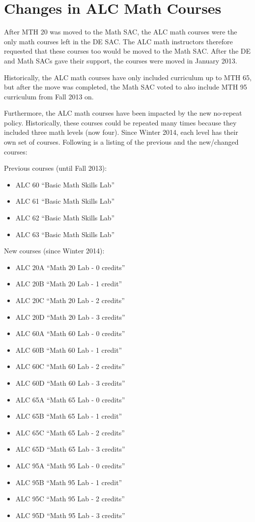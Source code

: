 \chapter{Changes in ALC Math Courses}\label{app:sec:alc}
After MTH 20 was moved to the Math SAC, the ALC math courses were the only math courses left in the DE SAC. The ALC math instructors therefore requested that these courses too would be moved to the Math SAC. After the DE and Math SACs gave their support, the courses were moved in January 2013.

Historically, the ALC math courses have only included curriculum up to MTH 65, but after the move was completed, the Math SAC voted to also include MTH 95 curriculum from Fall 2013 on.

Furthermore, the ALC math courses have been impacted by the new no-repeat policy. Historically, these courses could be repeated many times because they included three math levels (now four). Since Winter 2014, each level has their own set of courses. Following is a listing  of the previous and the new/changed courses:

Previous courses (until Fall 2013):
\begin{itemize}[label={}]
  \item ALC 60 ``Basic Math Skills Lab''
  \item ALC 61 ``Basic Math Skills Lab''
  \item ALC 62 ``Basic Math Skills Lab''
  \item ALC 63 ``Basic Math Skills Lab''
\end{itemize}
New courses (since Winter 2014):
\begin{itemize}[label={}]
  \item ALC 20A ``Math 20 Lab - 0 credits'' 
  \item ALC 20B ``Math 20 Lab - 1 credit'' 
  \item ALC 20C ``Math 20 Lab - 2 credits'' 
  \item ALC 20D ``Math 20 Lab - 3 credits'' 

  \item ALC 60A ``Math 60 Lab - 0 credits'' 
  \item ALC 60B ``Math 60 Lab - 1 credit'' 
  \item ALC 60C ``Math 60 Lab - 2 credits'' 
  \item ALC 60D ``Math 60 Lab - 3 credits'' 

  \item ALC 65A ``Math 65 Lab - 0 credits'' 
  \item ALC 65B ``Math 65 Lab - 1 credit'' 
  \item ALC 65C ``Math 65 Lab - 2 credits'' 
  \item ALC 65D ``Math 65 Lab - 3 credits'' 

  \item ALC 95A ``Math 95 Lab - 0 credits'' 
  \item ALC 95B ``Math 95 Lab - 1 credit'' 
  \item ALC 95C ``Math 95 Lab - 2 credits'' 
  \item ALC 95D ``Math 95 Lab - 3 credits''
\end{itemize}

